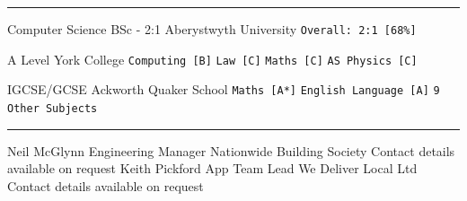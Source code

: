 \documentclass[12pt]{developercv} %
\begin{document}

\vspace{\baselineskip}
\hrule
\vspace{\baselineskip}


\vspace{+\baselineskip} %

\begin{entrylist}
\entry
	{}
	{Computer Science BSc - 2:1}
	{Aberystwyth University}
	{
		\texttt{Overall: 2:1 [68\%]}
	}
		

\entry
	{}
	{A Level}
	{York College}
	{
		\texttt{Computing [B]}\slashsep
		\texttt{Law [C]}\slashsep
		\texttt{Maths [C]}\slashsep
		\texttt{AS Physics [C]}
	}


\entry
	{}
	{IGCSE/GCSE}
	{Ackworth Quaker School}
	{
		\texttt{Maths [A*]}\slashsep
		\texttt{English Language [A]}\slashsep
		\texttt{9 Other Subjects}
	}
\end{entrylist}


\vspace{\baselineskip}
\hrule
\vspace{\baselineskip}



\vspace{\baselineskip}

\begin{entrylist}
	\entry
		{Neil McGlynn}
		{Engineering Manager}
		{Nationwide Building Society}
		{
		Contact details available on request
		}	
	\entry
		{Keith Pickford}
		{App Team Lead}
		{We Deliver Local Ltd}
		{
		Contact details available on request
		}
	

\end{entrylist}
\end{document}
